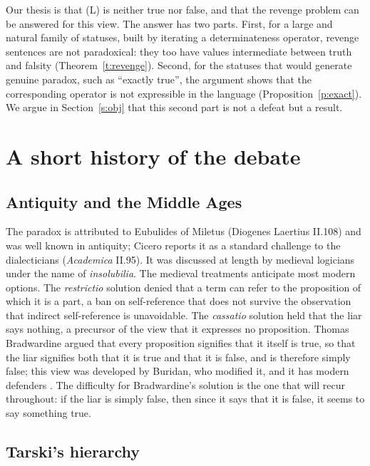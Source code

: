 \documentclass{situationist-preprint}
\begin{document}
Our thesis is that (L) is neither true nor false, and that the revenge problem can be answered for this view. The answer has two parts. First, for a large and natural family of statuses, built by iterating a determinateness operator, revenge sentences are not paradoxical: they too have values intermediate between truth and falsity (Theorem~\ref{t:revenge}). Second, for the statuses that would generate genuine paradox, such as \enquote{exactly true}, the argument shows that the corresponding operator is not expressible in the language (Proposition~\ref{p:exact}). We argue in Section~\ref{s:obj} that this second part is not a defeat but a result.

\section{A short history of the debate}

\subsection{Antiquity and the Middle Ages}

The paradox is attributed to Eubulides of Miletus (Diogenes Laertius II.108) and was well known in antiquity; Cicero reports it as a standard challenge to the dialecticians (\emph{Academica} II.95). It was discussed at length by medieval logicians under the name of \emph{insolubilia}. The medieval treatments anticipate most modern options. The \emph{restrictio} solution denied that a term can refer to the proposition of which it is a part, a ban on self-reference that does not survive the observation that indirect self-reference is unavoidable. The \emph{cassatio} solution held that the liar says nothing, a precursor of the view that it expresses no proposition. Thomas Bradwardine argued that every proposition signifies that it itself is true, so that the liar signifies both that it is true and that it is false, and is therefore simply false; this view was developed by Buridan, who modified it, and it has modern defenders \citep{Read2002}. The difficulty for Bradwardine's solution is the one that will recur throughout: if the liar is simply false, then since it says that it is false, it seems to say something true.

\subsection{Tarski's hierarchy}
\end{document}
